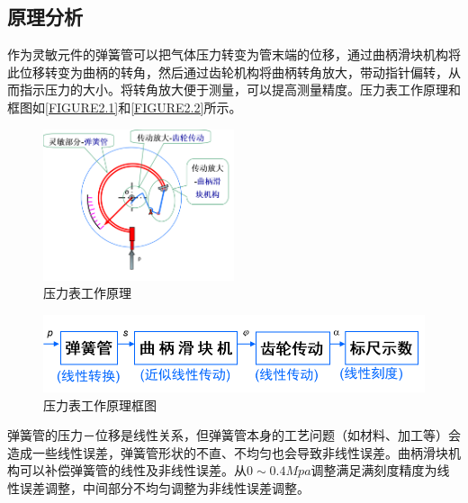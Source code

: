 \subsection{原理分析}
作为灵敏元件的弹簧管可以把气体压力转变为管末端的位移，通过曲柄滑块机构将此位移转变为曲柄的转角，然后通过齿轮机构将曲柄转角放大，带动指针偏转，从而指示压力的大小。将转角放大便于测量，可以提高测量精度。压力表工作原理和框图如\autoref{FIGURE2.1}和\autoref{FIGURE2.2}所示。
\begin{figure}[!htbp]
    \centering
    \includegraphics[width =0.5\textwidth]{figures/2.1.png}
    \caption{压力表工作原理}
    \label{FIGURE2.1}
\end{figure}
\begin{figure}[!htbp]
    \centering
    \includegraphics[width =\textwidth]{figures/2.2.png}
    \caption{压力表工作原理框图}
    \label{FIGURE2.2}
\end{figure}
\newpage
弹簧管的压力－位移是线性关系，但弹簧管本身的工艺问题（如材料、加工等）会造成一些线性误差，弹簧管形状的不直、不均匀也会导致非线性误差。曲柄滑块机构可以补偿弹簧管的线性及非线性误差。从$0{\sim}0.4Mpa$调整满足满刻度精度为线性误差调整，中间部分不均匀调整为非线性误差调整。

